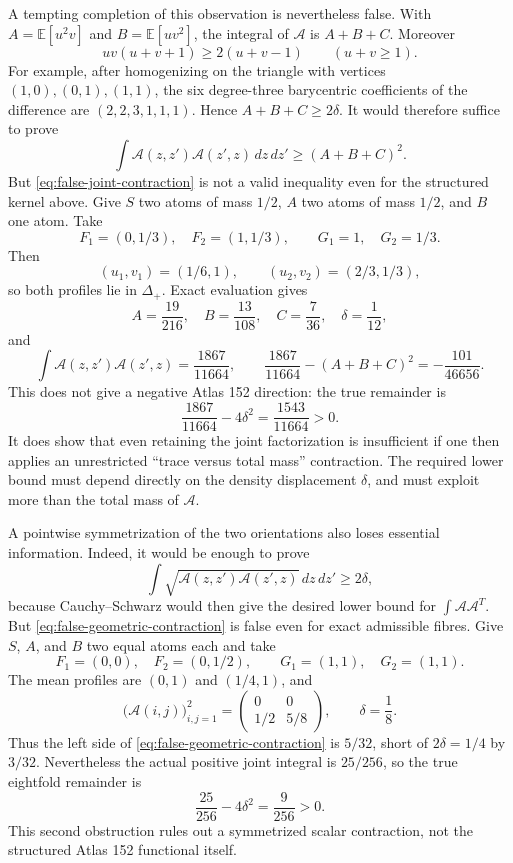 \documentclass[11pt]{article}
\begin{document}
A tempting completion of this observation is nevertheless false.  With
$A=\mathbb E[u^2v]$ and $B=\mathbb E[uv^2]$, the integral of
$\mathcal A$ is $A+B+C$.  Moreover
\[
 uv(u+v+1)\geq2(u+v-1)\qquad (u+v\geq1).
\]
For example, after homogenizing on the triangle with vertices
$(1,0),(0,1),(1,1)$, the six degree-three barycentric coefficients of the
difference are $(2,2,3,1,1,1)$.  Hence $A+B+C\geq2\delta$.  It would
therefore suffice to prove
\begin{equation}
 \int\mathcal A(z,z')\mathcal A(z',z)\,dz\,dz'
 \geq(A+B+C)^2.
 \label{eq:false-joint-contraction}
\end{equation}
But \eqref{eq:false-joint-contraction} is not a valid inequality even for
the structured kernel above.  Give $S$ two atoms of mass $1/2$, $A$ two
atoms of mass $1/2$, and $B$ one atom.  Take
\[
 F_1=(0,1/3),\quad F_2=(1,1/3),\qquad
 G_1=1,\quad G_2=1/3.
\]
Then
\[
 (u_1,v_1)=(1/6,1),\qquad (u_2,v_2)=(2/3,1/3),
\]
so both profiles lie in $\Delta_+$.  Exact evaluation gives
\[
 A=\frac{19}{216},\quad B=\frac{13}{108},\quad C=\frac7{36},
 \quad \delta=\frac1{12},
\]
and
\[
 \int\mathcal A(z,z')\mathcal A(z',z)=\frac{1867}{11664},
 \qquad
 \frac{1867}{11664}-(A+B+C)^2=-\frac{101}{46656}.
\]
This does not give a negative Atlas 152 direction: the true remainder is
\[
 \frac{1867}{11664}-4\delta^2=\frac{1543}{11664}>0.
\]
It does show that even retaining the joint factorization is insufficient if
one then applies an unrestricted ``trace versus total mass'' contraction.
The required lower bound must depend directly on the density displacement
$\delta$, and must exploit more than the total mass of $\mathcal A$.

A pointwise symmetrization of the two orientations also loses essential
information.  Indeed, it would be enough to prove
\begin{equation}
 \int\sqrt{\mathcal A(z,z')\mathcal A(z',z)}\,dz\,dz'
 \geq2\delta,
 \label{eq:false-geometric-contraction}
\end{equation}
because Cauchy--Schwarz would then give the desired lower bound for
$\int\mathcal A\mathcal A^T$.  But
\eqref{eq:false-geometric-contraction} is false even for exact admissible
fibres.  Give $S$, $A$, and $B$ two equal atoms each and take
\[
 F_1=(0,0),\quad F_2=(0,1/2),\qquad
 G_1=(1,1),\quad G_2=(1,1).
\]
The mean profiles are $(0,1)$ and $(1/4,1)$, and
\[
 \bigl(\mathcal A(i,j)\bigr)_{i,j=1}^2
 =\begin{pmatrix}0&0\\[2pt]1/2&5/8\end{pmatrix},
 \qquad \delta=\frac18.
\]
Thus the left side of \eqref{eq:false-geometric-contraction} is $5/32$,
short of $2\delta=1/4$ by $3/32$.  Nevertheless the actual positive joint
integral is $25/256$, so the true eightfold remainder is
\[
 \frac{25}{256}-4\delta^2=\frac9{256}>0.
\]
This second obstruction rules out a symmetrized scalar contraction, not the
structured Atlas 152 functional itself.
\end{document}
